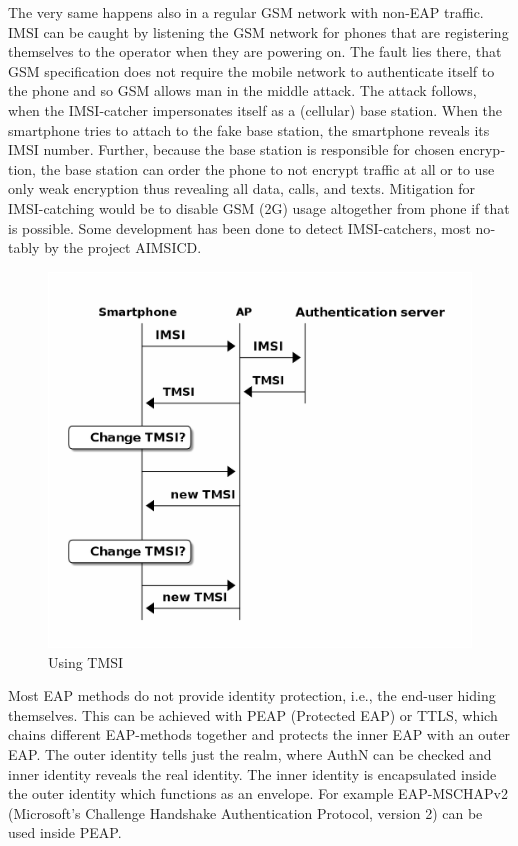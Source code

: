 \documentclass[12pt,a4paper,english]{tutthesis}
\begin{document}
\begin{otherlanguage}{english}
The very same happens also in a regular GSM network with non-EAP traffic.
IMSI can be caught by listening the GSM network for phones that are
registering themselves to the operator when they are powering on.
The fault lies there, that GSM specification does not require the
mobile network to authenticate itself to the phone and so GSM allows
man in the middle attack. 
The attack follows, when the IMSI-catcher impersonates itself as a
(cellular) base station.  When the smartphone tries to attach to the fake base
station, the smartphone reveals its IMSI number. Further, because the
base station is responsible for chosen encryption, the base station
can order the phone to not encrypt traffic at all or to use only weak
encryption thus revealing all data, calls, and texts. Mitigation for
IMSI-catching would be to disable GSM (2G) usage altogether from phone
if that is possible\cite{imsi-heise}. Some development has been done to detect 
IMSI-catchers, most notably by the project AIMSICD\cite{aimcid}.


\begin{figure}[htb]
\centering
\includegraphics[width=.9\linewidth]{imsi-tmsi.png}
\caption{\label{fig:tmsi}Using TMSI}
\end{figure}


Most EAP methods do not provide identity protection, i.e., the
end-user hiding themselves.
This can be achieved with PEAP (Protected EAP) or TTLS, which
chains different EAP-methods together and protects the inner EAP with
an outer EAP. 
The outer identity tells just the realm, where AuthN can be checked
and inner identity reveals the real identity.  The inner identity is
encapsulated inside the outer identity which functions as an
envelope. 
For example EAP-MSCHAPv2 (Microsoft's Challenge
Handshake Authentication Protocol, version 2) can be used inside PEAP.



\end{otherlanguage}
\end{document}
